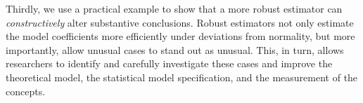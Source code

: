 \documentclass[12pt]{article}
\begin{document}
Thirdly, we use a practical example to show that a more robust estimator can \textit{constructively} alter substantive conclusions. 
Robust estimators not only estimate the model coefficients more efficiently under deviations from normality, but more importantly, allow unusual cases to stand out as unusual. 
This, in turn, allows researchers to identify and carefully investigate these cases and improve the theoretical model, the statistical model specification, and the measurement of the concepts.

\singlespace


\end{document}
